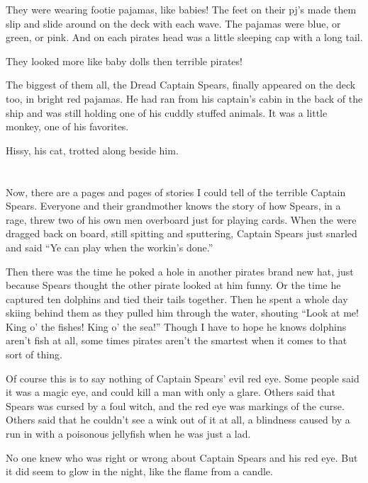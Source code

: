 \documentclass[12pt]{extbook}
\begin{document}
  They were wearing footie pajamas, like babies! The feet on their pj's
  made them slip and slide around on the deck with each wave. The pajamas
  were blue, or green, or pink. And on each pirates head was a little
  sleeping cap with a long tail.
  
  They looked more like baby dolls then terrible pirates!
  
  The biggest of them all, the Dread Captain Spears, finally appeared on
  the deck too, in bright red pajamas. He had ran from his captain's cabin
  in the back of the ship and was still holding one of his cuddly stuffed
  animals. It was a little monkey, one of his favorites.
  
  Hissy, his cat, trotted along beside him.
  
  \section{}\label{section-5}
  
  Now, there are a pages and pages of stories I could tell of the terrible
  Captain Spears. Everyone and their grandmother knows the story of how
  Spears, in a rage, threw two of his own men overboard just for playing
  cards. When the were dragged back on board, still spitting and
  sputtering, Captain Spears just snarled and said \enquote{Ye can play
  when the workin's done.}
  
  Then there was the time he poked a hole in another pirates brand new
  hat, just because Spears thought the other pirate looked at him funny.
  Or the time he captured ten dolphins and tied their tails together. Then
  he spent a whole day skiing behind them as they pulled him through the
  water, shouting \enquote{Look at me! King o' the fishes! King o' the
  sea!} Though I have to hope he knows dolphins aren't fish at all, some
  times pirates aren't the smartest when it comes to that sort of thing.
  
  Of course this is to say nothing of Captain Spears' evil red eye. Some
  people said it was a magic eye, and could kill a man with only a glare.
  Others said that Spears was cursed by a foul witch, and the red eye was
  markings of the curse. Others said that he couldn't see a wink out of it
  at all, a blindness caused by a run in with a poisonous jellyfish when
  he was just a lad.
  
  No one knew who was right or wrong about Captain Spears and his red eye.
  But it did seem to glow in the night, like the flame from a candle.
  
\end{document}
